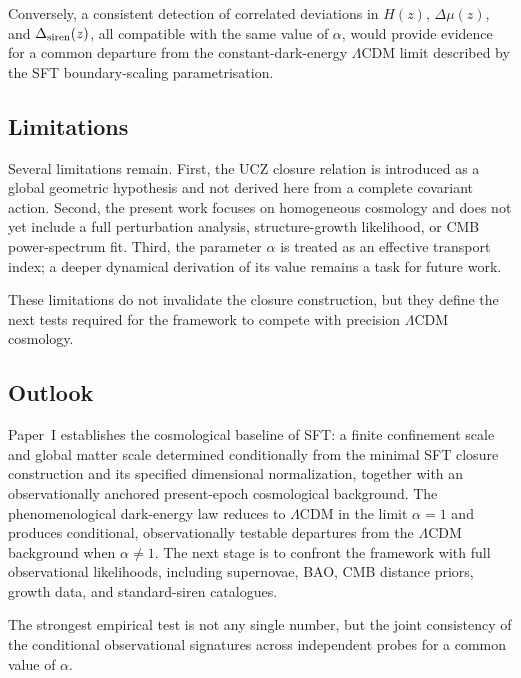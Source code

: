 \documentclass[12pt]{article}
\begin{document}
Conversely, a consistent detection of correlated deviations in $H(z)$,
$\Delta\mu(z)$, and $\Delta_{\rm siren}(z)$, all compatible with the
same value of $\alpha$, would provide evidence for a common departure
from the constant-dark-energy $\Lambda$CDM limit described by the SFT
boundary-scaling parametrisation.

\subsection{Limitations}

Several limitations remain. First, the UCZ closure relation is introduced as a
global geometric hypothesis and not derived here from a complete covariant
action. Second, the present work focuses on homogeneous cosmology and does not
yet include a full perturbation analysis, structure-growth likelihood, or
CMB power-spectrum fit. Third, the parameter $\alpha$ is treated as an effective
transport index; a deeper dynamical derivation of its value remains a task for
future work.

These limitations do not invalidate the closure construction, but they define
the next tests required for the framework to compete with precision
$\Lambda$CDM cosmology.

\subsection{Outlook}

Paper~I establishes the cosmological baseline of SFT: a finite confinement
scale and global matter scale determined conditionally from the minimal SFT
closure construction and its specified dimensional normalization, together
with an observationally anchored present-epoch cosmological background.
The phenomenological dark-energy law reduces to $\Lambda$CDM in the limit
$\alpha=1$ and produces conditional, observationally testable departures
from the $\Lambda$CDM background when $\alpha\neq1$. The next stage is to
confront the framework with full observational likelihoods, including
supernovae, BAO, CMB distance priors, growth data, and standard-siren
catalogues.

The strongest empirical test is not any single number, but the joint
consistency of the conditional observational signatures across independent
probes for a common value of $\alpha$.

\end{document}
